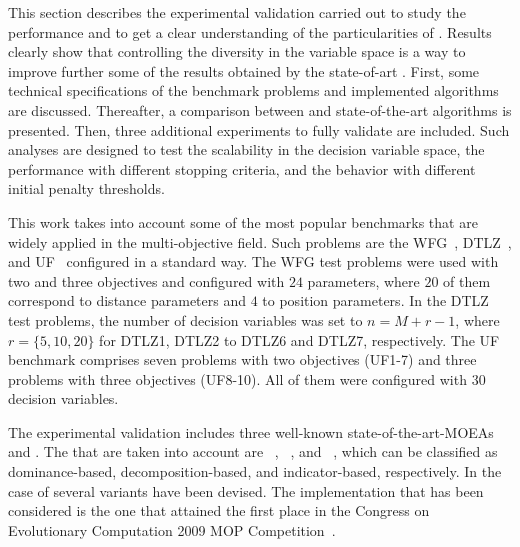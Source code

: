 This section describes the experimental validation carried out to study the performance and
to get a clear understanding of the particularities of \VSDMOEA{}.
%
Results clearly show that controlling the diversity in the variable space is a way to improve further some of the results 
obtained by the state-of-art \MOEAS{}.
%
First, some technical specifications of the benchmark problems and implemented algorithms are discussed.
%
Thereafter, a comparison between \VSDMOEA{} and state-of-the-art algorithms is presented.
%
Then, three additional experiments to fully validate \VSDMOEA{} are included.
%
Such analyses are designed to test the scalability in the decision variable space, the performance with different stopping criteria, 
and the behavior with different initial penalty thresholds.

This work takes into account some of the most popular benchmarks that are widely applied in the multi-objective field.
%
Such problems are the WFG~\cite{Joel:WFG}, DTLZ~\cite{Joel:DTLZ}, and UF~\cite{Joel:CEC2009} configured in a 
standard way.
%
The WFG test problems were used with two and three objectives
and configured with $24$ parameters, where $20$ of them correspond to distance parameters and $4$ to position parameters.
%
In the DTLZ test problems, the number of decision variables was set to $n=M+r-1$, where $r=\{5, 10, 20\}$ for DTLZ1, DTLZ2 to DTLZ6 and DTLZ7, respectively.
% 
The UF benchmark comprises seven problems with two objectives (UF1-7) and three problems with three objectives (UF8-10).
%
All of them were configured with $30$ decision variables.

The experimental validation includes three well-known state-of-the-art-MOEAs and \VSDMOEA{}.
%
The \MOEAS{} that are taken into account are \NSGAII{}~\cite{Joel:jMetal}, \MOEAD{}~\cite{MOEADCode}, and \RMOEA{}~\cite{R2EMOACode}, 
which can be classified as dominance-based, decomposition-based, and indicator-based, respectively.
%
In the case of \MOEAD{} several variants have been devised.
%
The \MOEAD{} implementation that has been considered is the one that attained the first place in the Congress on Evolutionary Computation 
2009 MOP Competition~\cite{zhang2009performance}.

